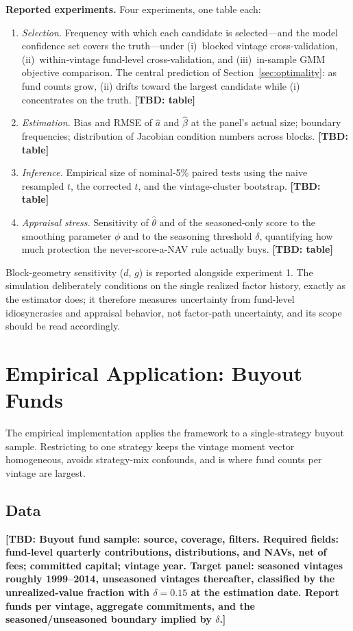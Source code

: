 \documentclass[11pt]{article}
\newcommand{\tbd}[1]{\textbf{[TBD: #1]}}
\begin{document}
\textbf{Reported experiments.} Four experiments, one table each:
\begin{enumerate}
\item \emph{Selection.} Frequency with which each candidate is selected---and the model confidence set covers the truth---under (i)~blocked vintage cross-validation, (ii)~within-vintage fund-level cross-validation, and (iii)~in-sample GMM objective comparison. The central prediction of Section~\ref{sec:optimality}: as fund counts grow, (ii) drifts toward the largest candidate while (i) concentrates on the truth. \tbd{table}
\item \emph{Estimation.} Bias and RMSE of \(\hat a\) and \(\hat\beta\) at the panel's actual size; boundary frequencies; distribution of Jacobian condition numbers across blocks. \tbd{table}
\item \emph{Inference.} Empirical size of nominal-5\% paired tests using the naive resampled \(t\), the corrected \(t\), and the vintage-cluster bootstrap. \tbd{table}
\item \emph{Appraisal stress.} Sensitivity of \(\hat\theta\) and of the seasoned-only score to the smoothing parameter \(\phi\) and to the seasoning threshold \(\delta\), quantifying how much protection the never-score-a-NAV rule actually buys. \tbd{table}
\end{enumerate}
Block-geometry sensitivity (\(d\), \(g\)) is reported alongside experiment 1. The simulation deliberately conditions on the single realized factor history, exactly as the estimator does; it therefore measures uncertainty from fund-level idiosyncrasies and appraisal behavior, not factor-path uncertainty, and its scope should be read accordingly.

\section{Empirical Application: Buyout Funds}
\label{sec:empirics}

The empirical implementation applies the framework to a single-strategy buyout sample. Restricting to one strategy keeps the vintage moment vector homogeneous, avoids strategy-mix confounds, and is where fund counts per vintage are largest.

\subsection{Data}

\tbd{Buyout fund sample: source, coverage, filters. Required fields: fund-level quarterly contributions, distributions, and NAVs, net of fees; committed capital; vintage year. Target panel: seasoned vintages roughly 1999--2014, unseasoned vintages thereafter, classified by the unrealized-value fraction with \(\delta=0.15\) at the estimation date. Report funds per vintage, aggregate commitments, and the seasoned/unseasoned boundary implied by \(\delta\).}
\end{document}
